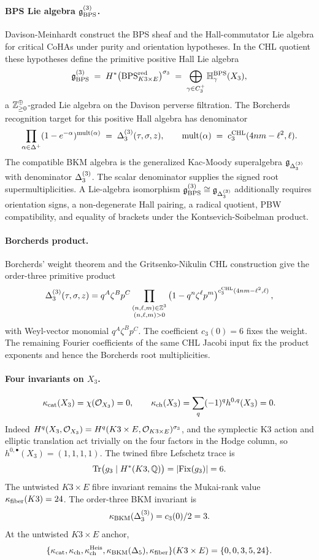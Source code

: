 \paragraph{BPS Lie algebra $\mathfrak{g}^{(3)}_{\mathrm{BPS}}$.}
Davison-Meinhardt construct the BPS sheaf and the Hall-commutator Lie
algebra for critical CoHAs under purity and orientation hypotheses. In
the CHL quotient these hypotheses define the primitive positive Hall
Lie algebra
\[
  \mathfrak{g}^{(3)}_{\mathrm{BPS}}
  \;=\;
  H^*\bigl(\mathrm{BPS}^{\mathrm{red}}_{K3\times E}\bigr)^{\sigma_3}
  \;=\;
  \bigoplus_{\gamma\in C^+_3}
  \mathbb{H}^{\mathrm{BPS}}_\gamma(X_3),
\]
a $\mathbb{Z}_{\geq0}^{\oplus}$-graded Lie algebra on the Davison perverse
filtration. The Borcherds recognition target for this positive Hall
algebra has denominator
\[
  \prod_{\alpha\in\Delta^+}
  (1 - e^{-\alpha})^{\mathrm{mult}(\alpha)}
  \;=\; \Delta_{3}^{(3)}(\tau,\sigma,z),
  \qquad
  \mathrm{mult}(\alpha)
  \;=\;
  c^{\mathrm{CHL}}_3(4nm-\ell^2,\ell).
\]
The compatible BKM algebra is the generalized Kac-Moody superalgebra
$\mathfrak{g}_{\Delta_3^{(3)}}$ with denominator $\Delta_{3}^{(3)}$. The scalar
denominator supplies the signed root supermultiplicities. A Lie-algebra
isomorphism
$\mathfrak{g}^{(3)}_{\mathrm{BPS}}\cong\mathfrak{g}_{\Delta_3^{(3)}}$ additionally requires
orientation signs, a non-degenerate Hall pairing, a radical quotient,
PBW compatibility, and equality of brackets under the
Kontsevich-Soibelman product.

\paragraph{Borcherds product.}
Borcherds' weight theorem and the Gritsenko-Nikulin CHL construction
give the order-three primitive product
\[
  \Delta_{3}^{(3)}(\tau,\sigma,z)
  =
  q^A\zeta^B p^C
  \prod_{\substack{(n,\ell,m)\in\mathbb{Z}^3\\(n,\ell,m)>0}}
  \left(1-q^n\zeta^\ell p^m\right)^{
    c^{\mathrm{CHL}}_3(4nm-\ell^2,\ell)} ,
\]
with Weyl-vector monomial $q^A\zeta^B p^C$. The coefficient
$c_3(0)=6$ fixes the weight. The remaining Fourier coefficients of
the same CHL Jacobi input fix the product exponents and hence the
Borcherds root multiplicities.

\paragraph{Four invariants on $X_3$.}
\[
  \kappa_{\mathrm{cat}}(X_3)=\chi(\mathcal{O}_{X_3})=0,\qquad
  \kappa_{\mathrm{ch}}(X_3)=\sum_q(-1)^qh^{0,q}(X_3)=0.
\]
Indeed
$H^q(X_3,\mathcal{O}_{X_3})=H^q(K3\times E,\mathcal{O}_{K3\times E})^{\sigma_3}$, and
the symplectic K3 action and elliptic translation act trivially on the
four factors in the Hodge column, so
$h^{0,\bullet}(X_3)=(1,1,1,1)$. The twined fibre Lefschetz trace is
\[
  \mathrm{Tr}\bigl(g_3\mid H^*(K3,\mathbb{Q})\bigr)=|\mathrm{Fix}(g_3)|=6.
\]
The untwisted \(K3\times E\) fibre invariant remains the Mukai-rank
value \(\kappa_{\mathrm{fiber}}(K3)=24\). The order-three BKM invariant is
\[
  \kappa_{\mathrm{BKM}}(\Delta_{3}^{(3)})=c_3(0)/2=3.
\]
At the untwisted \(K3\times E\) anchor,
\[
  \{\kappa_{\mathrm{cat}},\kappa_{\mathrm{ch}},\kappa_{\mathrm{ch}}^{\mathrm{Heis}},
  \kappa_{\mathrm{BKM}}(\Delta_5),\kappa_{\mathrm{fiber}}\}(K3\times E)
  =
  \{0,0,3,5,24\}.
\]

